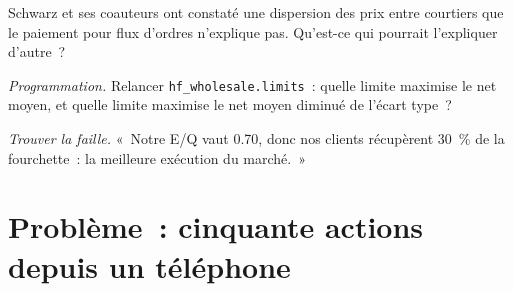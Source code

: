 \begin{exercise}[$\star\star$]\label{exo:hf:retail-wholesaling:6}
Schwarz et ses coauteurs ont constaté une dispersion des prix entre courtiers que le paiement pour flux d'ordres n'explique pas. Qu'est-ce qui pourrait l'expliquer d'autre~?
\end{exercise}

\begin{exercise}[$\star\star\star$]\label{exo:hf:retail-wholesaling:7}
\emph{Programmation.} Relancer \texttt{hf\_wholesale.limits}~: quelle limite maximise le net moyen, et quelle limite maximise le net moyen diminué de l'écart type~?
\end{exercise}

\begin{exercise}[$\star\star\star$]\label{exo:hf:retail-wholesaling:8}
\emph{Trouver la faille.} «~Notre E/Q vaut 0.70, donc nos clients récupèrent 30~\% de la fourchette~: la meilleure exécution du marché.~»
\end{exercise}

\section{Problème~: cinquante actions depuis un téléphone}

